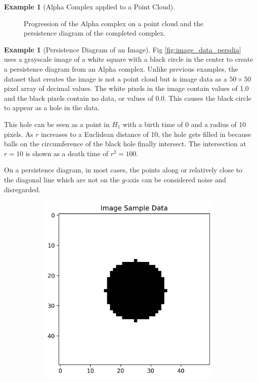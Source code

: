 \documentclass[ma]{uncgdissertationexp}
\theoremstyle{plain}
\theoremstyle{definition}
\newtheorem{example}[theorem]{Example}
\theoremstyle{remark}
\begin{document}
\begin{example}[Alpha Complex applied to a Point Cloud]
\begin{figure}[H]
    \caption{Progression of the Alpha complex on a point cloud and the persistence diagram of the completed complex.}
    \label{fig:point_cloud_alpha_complex}
\end{figure}
\end{example}

\newpage
\begin{example}[Persistence Diagram of an Image]
\par Fig \ref{fig:image_data_persdia} uses a grayscale image of a white square with a black circle in the center to create a persistence diagram from an Alpha complex. Unlike previous examples, the dataset that creates the image is not a point cloud but is image data as a $50\times50$ pixel array of decimal values. The white pixels in the image contain values of 1.0 and the black pixels contain no data, or values of 0.0. This causes the black circle to appear as a hole in the data.
\par This hole can be seen as a point in $H_1$ with a birth time of 0 and a radius of 10 pixels. As $r$ increases to a Euclidean distance of 10, the hole gets filled in because balls on the circumference of the black hole finally intersect. The intersection at $r=10$ is shown as a death time of ${r}^2 = 100$.
\par On a persistence diagram, in most cases, the points along or relatively close to the diagonal line which are not on the $y$-axis can be considered noise and disregarded.
\begin{figure}[H]
    \centering
    \begin{subfigure}[b]{0.45\textwidth}
        \centering
        \includegraphics[width=\textwidth]{image_data_plot.png}

\end{subfigure}
\end{figure}
\end{example}
\end{document}
